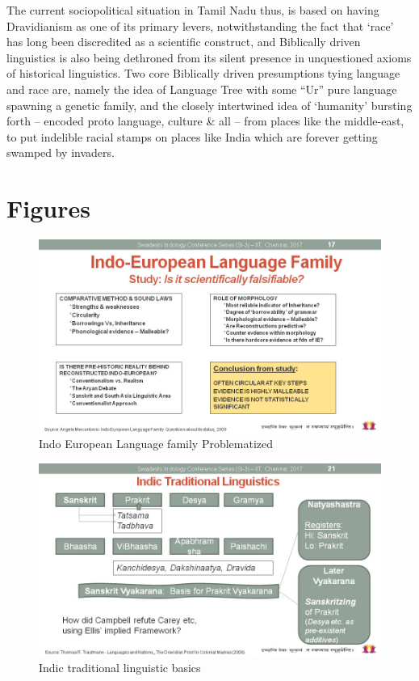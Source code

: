 The current sociopolitical situation in Tamil Nadu thus, is based on having Dravidianism as one of its primary levers, notwithstanding the fact that ‘race’ has long been discredited as a scientific construct, and Biblically driven linguistics is also being dethroned from its silent presence in unquestioned axioms of historical linguistics. Two core Biblically driven presumptions tying language and race are, namely the idea of Language Tree with some “Ur” pure language spawning a genetic family, and the closely intertwined idea of ‘humanity’ bursting forth – encoded proto language, culture \& all – from places like the middle-east, to put indelible racial stamps on places like India which are forever getting swamped by invaders.


\section*{Figures}

\vskip -7pt

\begin{figure}
\includegraphics[scale=0.29]{"images/article-02/art02-fig01.jpg"}
\caption{Indo European Language family Problematized}\label{art2-fig01}
\end{figure}


\begin{figure}
\includegraphics[scale=0.29]{"images/article-02/art02-fig02.jpg"}
\caption{Indic traditional linguistic basics}\label{art2-fig02}
\end{figure}


